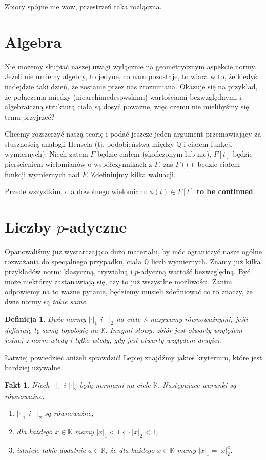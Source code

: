 \documentclass[a4paper,fleqn,9pt]{extarticle}
\newtheorem{fkt}{Fakt}
\newtheorem{dff}{Definicja}
\newenvironment{enumx}{\begin{enumerate}
	\setlength{\itemsep}{0pt}
	\setlength{\parskip}{0pt}
	\setlength{\parsep}{0pt}}
{\end{enumerate}}
\begin{document}
Zbiory spójne nie wow, przestrzeń taka rozłączna.

\section{Algebra}
Nie możemy skupiać naszej uwagi wyłącznie na geometrycznym aspekcie normy.
Jeżeli nie umiemy algebry, to jedyne, co nam pozostaje, to wiara w to, że kiedyś nadejdzie taki dzień, że zostanie przez nas zrozumiana.
Okazuje się na przykład, że połączenia między (niearchimedesowskimi) wartościami bezwzględnymi i algebraiczną strukturą ciała są dosyć poważne, więc czemu nie mielibyśmy się temu przyjrzeć?

Chcemy rozszerzyć naszą teorię i podać jeszcze jeden argument przemawiający za słusznością analogii Hensela (tj. podobieństwa między $\mathbb Q$ i ciałem funkcji wymiernych).
Niech zatem $F$ będzie ciałem (skończonym lub nie), $F[t]$ będzie pierścieniem wielomianów o współczynnikach z $F$, zaś $F(t)$ będzie ciałem funkcji wymiernych nad $F$.
Zdefiniujmy kilka waluacji.

Przede wszystkim, dla dowolnego wielomianu $\phi(t) \in F[t]$ \textbf{to be continued}.

\section{Liczby $p$-adyczne}
Opanowaliśmy już wystarczająco dużo materiału, by móc ograniczyć nasze ogólne rozważania do specjalnego przypadku, ciała $\mathbb Q$ liczb wymiernych.
Znamy już kilka przykładów norm: klasyczną, trywialną i $p$-adyczną wartość bezwzględną.
Być może niektórzy zastanawiają się, czy to już wszystkie możliwości.
Zanim odpowiemy na to ważne pytanie, będziemy musieli zdefiniować co to znaczy, że dwie normy są \emph{takie same}.

\begin{dff}
Dwie normy $|\cdot|_1$ i $|\cdot|_2$ na ciele $\mathbb K$ nazywamy równoważnymi, jeśli definiuję tę samą topologię na $\mathbb K$.
Innymi słowy, zbiór jest otwarty względem jednej z norm wtedy i tylko wtedy, gdy jest otwarty względem drugiej.
\end{dff}

Łatwiej powiedzieć aniżeli sprawdzić!
Lepiej znajdźmy jakieś kryterium, które jest bardziej używalne.

\begin{fkt}
Niech $|\cdot|_1$ i $|\cdot|_2$ będą normami na ciele $\mathbb K$.
Następujące warunki są równoważne:
\begin{enumx}
\item $|\cdot|_1$ i $|\cdot|_2$ są równoważne,
\item dla każdego $x\in\mathbb K$ mamy $|x|_1 < 1 \iff |x|_2 < 1$,
\item istnieje takie dodatnie $a \in \mathbb R$, że dla każdego $x\in\mathbb K$ mamy $|x|_1 = |x|_2^a$.
\end{enumx}
\end{fkt}
\end{document}
